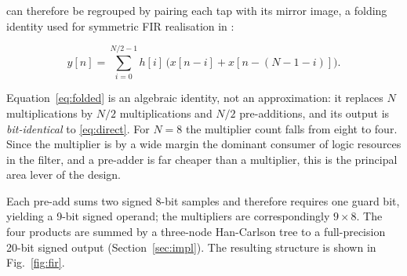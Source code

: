 \documentclass[conference]{IEEEtran}
\begin{document}
\noindent can therefore be regrouped by pairing each tap with its mirror
image, a folding identity used for symmetric FIR realisation in
\cite{kumar,gunasekaran}:

\begin{equation}
y[n] = \sum_{i=0}^{N/2-1} h[i]\,\big(x[n-i] + x[n-(N-1-i)]\big).
\label{eq:folded}
\end{equation}

\noindent Equation~\eqref{eq:folded} is an algebraic identity, not an
approximation: it replaces $N$ multiplications by $N/2$ multiplications
and $N/2$ pre-additions, and its output is \emph{bit-identical} to
\eqref{eq:direct}. For $N = 8$ the multiplier count falls from eight to
four. Since the multiplier is by a wide margin the dominant consumer of
logic resources in the filter, and a pre-adder is far cheaper than a
multiplier, this is the principal area lever of the design.

Each pre-add sums two signed 8-bit samples and therefore requires one
guard bit, yielding a 9-bit signed operand; the multipliers are
correspondingly $9 \times 8$. The four products are summed by a
three-node Han-Carlson tree to a full-precision 20-bit signed output
(Section~\ref{sec:impl}). The resulting structure is shown in
Fig.~\ref{fig:fir}.
\end{document}
